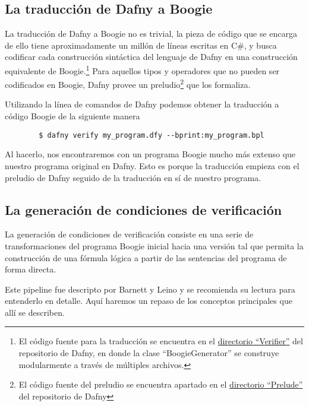 \documentclass[12pt, a4paper, openany, fleqn]{book}
\begin{document}
    \subsection{La traducción de Dafny a Boogie}
    La traducción de Dafny a Boogie no es trivial, la pieza de código que se encarga de ello tiene aproximadamente un millón de líneas escritas en C\#, y busca codificar cada construcción sintáctica del lenguaje de Dafny en una construcción equivalente de Boogie.\footnote{El código fuente para la traducción se encuentra en el \href{https://github.com/dafny-lang/dafny/tree/v4.7.0/Source/DafnyCore/Verifier}{directorio ``Verifier''} del repositorio de Dafny, en donde la clase ``BoogieGenerator'' se construye modularmente a través de múltiples archivos.} Para aquellos tipos y operadores que no pueden ser codificados en Boogie, Dafny provee un preludio\footnote{El código fuente del preludio se encuentra apartado en el \href{https://github.com/dafny-lang/dafny/blob/v4.7.0/Source/DafnyCore/DafnyPrelude.bpl}{directorio ``Prelude''} del repositorio de Dafny} que los formaliza.

    Utilizando la línea de comandos de Dafny podemos obtener la traducción a código Boogie de la siguiente manera
    \begin{verbatim}
        $ dafny verify my_program.dfy --bprint:my_program.bpl
    \end{verbatim}
    Al hacerlo, nos encontraremos con un programa Boogie mucho más extenso que nuestro programa original en Dafny. Esto es porque la traducción empieza con el preludio de Dafny seguido de la traducción en sí de nuestro programa.

    \subsection{La generación de condiciones de verificación}
    La generación de condiciones de verificación consiste en una serie de transformaciones del programa Boogie inicial hacia una versión tal que permita la construcción de una fórmula lógica a partir de las sentencias del programa de forma directa.

    Este pipeline fue descripto por Barnett y Leino\cite{10.1145/1108792.1108813} y se recomienda su lectura para entenderlo en detalle. Aquí haremos un repaso de los conceptos principales que allí se describen.
\end{document}
